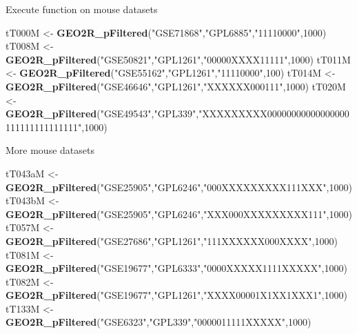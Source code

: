 \documentclass[
]{article}
\newenvironment{Shaded}{\begin{snugshade}}{\end{snugshade}}
\newcommand{\DecValTok}[1]{\textcolor[rgb]{0.00,0.00,0.81}{#1}}
\newcommand{\KeywordTok}[1]{\textcolor[rgb]{0.13,0.29,0.53}{\textbf{#1}}}
\newcommand{\NormalTok}[1]{#1}
\newcommand{\StringTok}[1]{\textcolor[rgb]{0.31,0.60,0.02}{#1}}
\begin{document}
Execute function on mouse datasets

\begin{Shaded}
\begin{Highlighting}[]
\NormalTok{tT000M <-}\StringTok{ }\KeywordTok{GEO2R_pFiltered}\NormalTok{(}\StringTok{"GSE71868"}\NormalTok{,}\StringTok{"GPL6885"}\NormalTok{,}\StringTok{"11110000"}\NormalTok{,}\DecValTok{1000}\NormalTok{)}
\NormalTok{tT008M <-}\StringTok{ }\KeywordTok{GEO2R_pFiltered}\NormalTok{(}\StringTok{"GSE50821"}\NormalTok{,}\StringTok{"GPL1261"}\NormalTok{,}\StringTok{"00000XXXX11111"}\NormalTok{,}\DecValTok{1000}\NormalTok{)}
\NormalTok{tT011M <-}\StringTok{ }\KeywordTok{GEO2R_pFiltered}\NormalTok{(}\StringTok{"GSE55162"}\NormalTok{,}\StringTok{"GPL1261"}\NormalTok{,}\StringTok{"11110000"}\NormalTok{,}\DecValTok{100}\NormalTok{)}
\NormalTok{tT014M <-}\StringTok{ }\KeywordTok{GEO2R_pFiltered}\NormalTok{(}\StringTok{"GSE46646"}\NormalTok{,}\StringTok{"GPL1261"}\NormalTok{,}\StringTok{"XXXXXX000111"}\NormalTok{,}\DecValTok{1000}\NormalTok{)}
\NormalTok{tT020M <-}\StringTok{ }\KeywordTok{GEO2R_pFiltered}\NormalTok{(}\StringTok{"GSE49543"}\NormalTok{,}\StringTok{"GPL339"}\NormalTok{,}\StringTok{"XXXXXXXXX00000000000000000111111111111111"}\NormalTok{,}\DecValTok{1000}\NormalTok{)}
\end{Highlighting}
\end{Shaded}

More mouse datasets

\begin{Shaded}
\begin{Highlighting}[]
\NormalTok{tT043aM <-}\StringTok{ }\KeywordTok{GEO2R_pFiltered}\NormalTok{(}\StringTok{"GSE25905"}\NormalTok{,}\StringTok{"GPL6246"}\NormalTok{,}\StringTok{"000XXXXXXXXX111XXX"}\NormalTok{,}\DecValTok{1000}\NormalTok{)}
\NormalTok{tT043bM <-}\StringTok{ }\KeywordTok{GEO2R_pFiltered}\NormalTok{(}\StringTok{"GSE25905"}\NormalTok{,}\StringTok{"GPL6246"}\NormalTok{,}\StringTok{"XXX000XXXXXXXXX111"}\NormalTok{,}\DecValTok{1000}\NormalTok{)}
\NormalTok{tT057M <-}\StringTok{ }\KeywordTok{GEO2R_pFiltered}\NormalTok{(}\StringTok{"GSE27686"}\NormalTok{,}\StringTok{"GPL1261"}\NormalTok{,}\StringTok{"111XXXXXX000XXXX"}\NormalTok{,}\DecValTok{1000}\NormalTok{)}
\NormalTok{tT081M <-}\StringTok{ }\KeywordTok{GEO2R_pFiltered}\NormalTok{(}\StringTok{"GSE19677"}\NormalTok{,}\StringTok{"GPL6333"}\NormalTok{,}\StringTok{"0000XXXXX1111XXXXX"}\NormalTok{,}\DecValTok{1000}\NormalTok{)}
\NormalTok{tT082M <-}\StringTok{ }\KeywordTok{GEO2R_pFiltered}\NormalTok{(}\StringTok{"GSE19677"}\NormalTok{,}\StringTok{"GPL1261"}\NormalTok{,}\StringTok{"XXXX00001X1XX1XXX1"}\NormalTok{,}\DecValTok{1000}\NormalTok{)}
\NormalTok{tT133M <-}\StringTok{ }\KeywordTok{GEO2R_pFiltered}\NormalTok{(}\StringTok{"GSE6323"}\NormalTok{,}\StringTok{"GPL339"}\NormalTok{,}\StringTok{"0000011111XXXXX"}\NormalTok{,}\DecValTok{1000}\NormalTok{)}
\end{Highlighting}
\end{Shaded}
\end{document}
